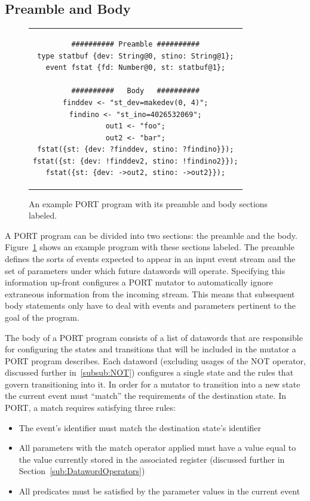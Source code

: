 \subsection{Preamble and Body}
\label{sub:PreambleAndBody}

\begin{figure}[h]
\centering
\begin{tabular}{c}
\begin{lstlisting}
########## Preamble ##########
type statbuf {dev: String@0, stino: String@1};
event fstat {fd: Number@0, st: statbuf@1};

##########   Body   ##########
finddev <- "st_dev=makedev(0, 4)";
findino <- "st_ino=4026532069";
out1 <- "foo";
out2 <- "bar";
fstat({st: {dev: ?finddev, stino: ?findino}});
fstat({st: {dev: !finddev2, stino: !findino2}});
fstat({st: {dev: ->out2, stino: ->out2}});
\end{lstlisting}
\end{tabular}
\caption{An example PORT program with its preamble and body sections
  labeled.}
\label{lst:PreambleBody}
\end{figure}



A PORT program can be divided into two sections: the preamble and the body.
Figure~\ref{lst:PreambleBody} shows an example program with these sections
labeled.
The preamble defines the sorts of events
expected
to appear in an input event stream and the set of parameters
under which future datawords will operate.  Specifying this information
up-front configures a PORT mutator to
automatically ignore extraneous information from the incoming stream.  This
means that subsequent body statements only have to deal with events and
parameters pertinent to the goal of the program.

The body of a PORT program consists of a list of datawords that
are responsible for configuring the states and transitions
that will be included in the mutator a PORT program describes.
Each dataword (excluding usages of the NOT operator, discussed further
in~\ref{subsub:NOT}) configures a single
state and the rules that govern transitioning into it.
In order for a mutator to transition into a new state
the current event must ``match'' the requirements of the destination state.
In PORT, a match requires satisfying three rules:

\begin{itemize}
\item{The event's identifier must match the destination state's identifier}
\item{All parameters with the match operator applied must have a value equal to
  the value currently stored in the associated register (discussed further
    in Section~\ref{sub:DatawordOperators})}
\item{All predicates must be satisfied by the parameter values in the
  current event}
\end{itemize}

